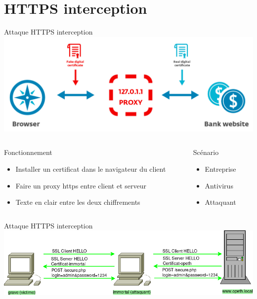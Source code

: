 \section{HTTPS interception}

\begin{frame}{Attaque HTTPS interception}
    \includegraphics[width=\linewidth]{../medias/interception-https.png}

    \hspace{10cm}

    \begin{columns}
        \begin{column}{0.7\textwidth}
            \begin{block}{Fonctionnement}
                \begin{itemize}
                    \item{Installer un certificat dans le navigateur du client}
                    \item{Faire un proxy https entre client et serveur}
                    \item{Texte en clair entre les deux chiffrements}
                \end{itemize}
            \end{block}

        \end{column}

        \begin{column}{0.3\textwidth}
            \begin{exampleblock}{Scénario}
                \begin{itemize}
                    \item{Entreprise}
                    \item{Antivirus}
                    \item{Attaquant}
                \end{itemize}
            \end{exampleblock}
        \end{column}
    \end{columns}

\end{frame}

\begin{frame}{Attaque HTTPS interception}
    \includegraphics[width=\linewidth]{../medias/https-interception/attack.png}
\end{frame}
